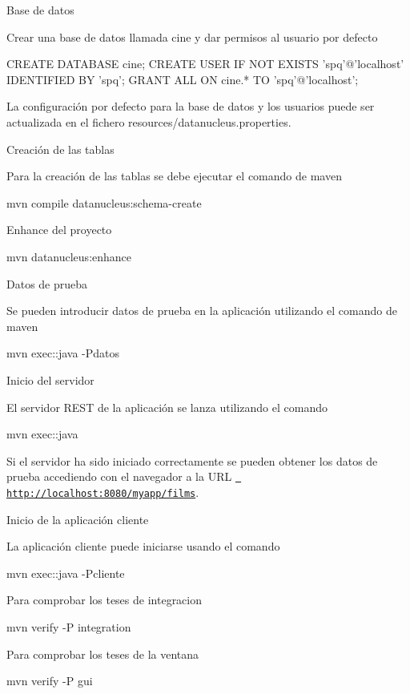 Base de datos

Crear una base de datos llamada cine y dar permisos al usuario por defecto \begin{DoxyVerb}CREATE DATABASE cine;
CREATE USER IF NOT EXISTS 'spq'@'localhost' IDENTIFIED BY 'spq';
GRANT ALL ON cine.* TO 'spq'@'localhost';
\end{DoxyVerb}
 La configuración por defecto para la base de datos y los usuarios puede ser actualizada en el fichero resources/datanucleus.\+properties.

Creación de las tablas

Para la creación de las tablas se debe ejecutar el comando de maven \begin{DoxyVerb}mvn compile datanucleus:schema-create
\end{DoxyVerb}
 Enhance del proyecto \begin{DoxyVerb}mvn datanucleus:enhance
\end{DoxyVerb}
 Datos de prueba

Se pueden introducir datos de prueba en la aplicación utilizando el comando de maven \begin{DoxyVerb}mvn exec::java -Pdatos
\end{DoxyVerb}
 Inicio del servidor

El servidor REST de la aplicación se lanza utilizando el comando \begin{DoxyVerb}mvn exec::java
\end{DoxyVerb}
 Si el servidor ha sido iniciado correctamente se pueden obtener los datos de prueba accediendo con el navegador a la URL \href{http://localhost:8080/myapp/films}{\texttt{ http\+://localhost\+:8080/myapp/films}}.

Inicio de la aplicación cliente

La aplicación cliente puede iniciarse usando el comando \begin{DoxyVerb}mvn exec::java -Pcliente
\end{DoxyVerb}
 Para comprobar los teses de integracion \begin{DoxyVerb}mvn verify -P integration
\end{DoxyVerb}
 Para comprobar los teses de la ventana \begin{DoxyVerb}mvn verify -P gui
\end{DoxyVerb}
 